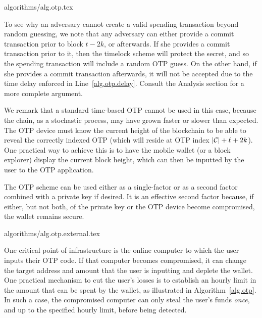{algorithms/alg.otp.tex}

To see why an adversary cannot create a valid spending transaction beyond random
guessing, we note that any adversary can either provide a commit transaction prior
to block $t - 2k$, or afterwards. If she provides a commit transaction
prior to it, then the timelock scheme will protect the secret, and so the spending
transaction will include a random OTP guess. On the other hand, if she provides a
commit transaction afterwards, it will not be accepted due to the time delay enforced
in Line~\ref{alg.otp.delay}. Consult the Analysis section for a more complete argument.

We remark that a standard time-based OTP cannot be used in this case, because the
chain, as a stochastic process, may have grown faster or slower than expected. The
OTP device must know the current height of the blockchain to be able to reveal the
correctly indexed OTP (which will reside at OTP index $|\mathcal{C}| + \ell + 2k$).
One practical way to achieve this is to have the mobile
wallet (or a block explorer) display the current block height, which can then be
inputted by the user to the OTP application.

The OTP scheme can be used either as a single-factor or as a second factor combined
with a private key if desired. It is an effective second factor because,
if either, but not both, of the private key or the OTP device become compromised,
the wallet remains secure.

{algorithms/alg.otp.external.tex}

One critical point of infrastructure is the online
computer to which the user inputs their OTP code. If that computer becomes
compromised, it can change the target address and amount that the user is
inputting and deplete the wallet. One practical mechanism to cut the user's losses
is to establish an hourly limit in the amount that can be spent by the wallet,
as illustrated in Algorithm~\ref{alg.otp}. In
such a case, the compromised computer can only steal the user's funds \emph{once},
and up to the specified hourly limit, before being detected.
